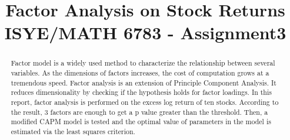 \documentclass[10pt, conference]{IEEEtran}
\begin{document}
%
\title{\huge Factor Analysis on Stock Returns \\ {\large ISYE/MATH 6783 - Assignment3}}


\author{
}







\maketitle

\begin{abstract}
Factor model is a widely used method to characterize the relationship between several variables. As the dimensions of factors increases, the cost of computation grows at a tremendous speed. Factor analysis is an extension of Principle Component Analysis. It reduces dimensionality by checking if the hypothesis holds for factor loadings. In this report, factor analysis is performed on the excess log return of ten stocks. According to the result, 3 factors are enough to get a p value greater than the threshold. Then, a modified CAPM model is tested and the optimal value of parameters in the model is estimated via the least squares criterion. 
\end{abstract}
\end{document}
